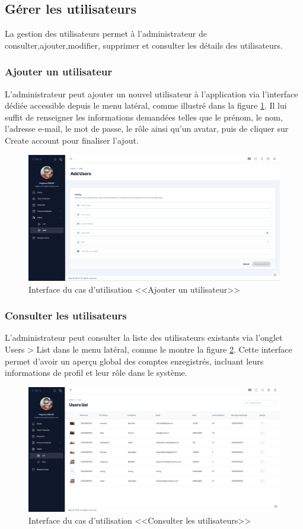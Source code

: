\subsection{Gérer les utilisateurs}
La gestion des utilisateurs permet à l’administrateur de consulter,ajouter,modifier, supprimer et consulter les détails des utilisateurs.
\subsubsection{Ajouter un utilisateur}
L'administrateur peut ajouter un nouvel utilisateur à l’application via l’interface dédiée accessible depuis le menu latéral, comme illustré dans la figure \ref{fig:adduser}. Il lui suffit de renseigner les informations demandées telles que le prénom, le nom, l’adresse e-mail, le mot de passe, le rôle ainsi qu’un avatar, puis de cliquer sur Create account pour finaliser l’ajout.
\begin{figure}[H]
     \centering
     \includegraphics[width=15cm]{images/realisation/addUser.png}
     \caption{Interface du cas d'utilisation <<Ajouter un utilisateur>>}
     \label{fig:adduser}
\end{figure}
\newpage
\subsubsection{Consulter les utilisateurs}
L’administrateur peut consulter la liste des utilisateurs existants via l’onglet Users > List dans le menu latéral, comme le montre la figure \ref{fig:viewusers}. Cette interface permet d’avoir un aperçu global des comptes enregistrés, incluant leurs informations de profil et leur rôle dans le système.
\begin{figure}[H]
     \centering
     \includegraphics[width=16cm]{images/realisation/vUser.png}
     \caption{Interface du cas d'utilisation <<Consulter les utilisateurs>>}
     \label{fig:viewusers}
\end{figure}
